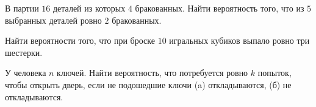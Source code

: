 \begin{problem}
    В партии $16$ деталей из которых $4$ бракованных.
    Найти вероятность того, что из $5$ выбранных деталей ровно $2$ бракованных.
\end{problem}

\begin{problem}
    Найти вероятности того, что при броске $10$ игральных кубиков выпало ровно три шестерки.
\end{problem}
\begin{problem}
    У человека $n$ ключей.
    Найти вероятность, что потребуется ровно $k$ попыток, чтобы открыть дверь, если не подошедшие ключи (a) откладываются, (б) не откладываются.
\end{problem}




